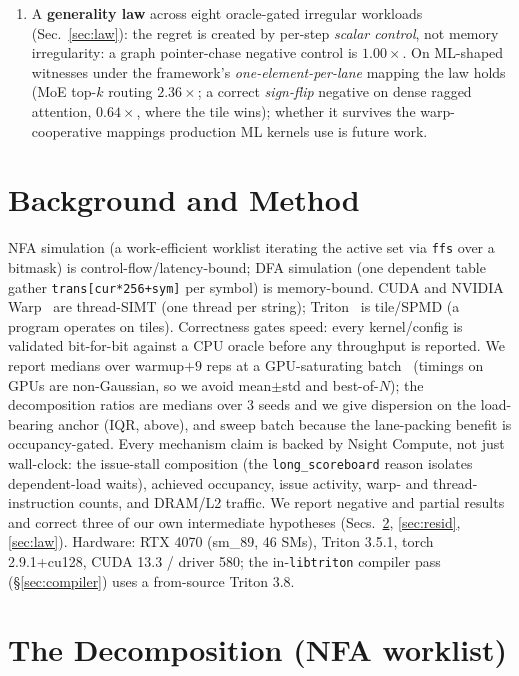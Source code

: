 \documentclass[sigplan,review,anonymous,10pt]{acmart}
\begin{document}
\begin{enumerate}
lowering is an existence proof ($4.2\times$, via \texttt{nvcc}).
\item A \textbf{generality law} across eight oracle-gated irregular workloads (Sec.~\ref{sec:law}):
the regret is created by per-step \emph{scalar control}, not memory irregularity: a graph pointer-chase
negative control is $1.00\times$. On ML-shaped witnesses under the framework's \emph{one-element-per-lane}
mapping the law holds (MoE top-$k$ routing $2.36\times$; a correct \emph{sign-flip} negative on dense
ragged attention, $0.64\times$, where the tile wins); whether it survives the warp-cooperative mappings
production ML kernels use is future work.
\end{enumerate}

\section{Background and Method}
NFA simulation (a work-efficient worklist iterating the active set via \texttt{ffs} over a bitmask) is
control-flow/latency-bound; DFA simulation (one dependent table gather \texttt{trans[cur*256+sym]} per
symbol) is memory-bound. CUDA and NVIDIA Warp~\cite{warp2022} are thread-SIMT (one thread per string);
Triton~\cite{triton2019} is tile/SPMD (a program operates on tiles). Correctness gates speed: every
kernel/config is validated bit-for-bit against a CPU oracle before any throughput is reported. We
report medians over warmup${+}9$ reps at a GPU-saturating batch~\cite{hoefler2015} (timings on GPUs
are non-Gaussian, so we avoid mean$\pm$std and best-of-$N$); the decomposition ratios are medians over 3
seeds and we give dispersion on the load-bearing anchor (IQR, above), and sweep batch because the lane-packing
benefit is occupancy-gated. Every mechanism claim is backed by Nsight Compute, not just wall-clock:
the issue-stall composition (the \texttt{long\_scoreboard} reason isolates dependent-load waits),
achieved occupancy, issue activity, warp- and thread-instruction counts, and DRAM/L2 traffic. We report negative and partial results and correct
three of our own intermediate hypotheses (Secs.~\ref{sec:decomp}, \ref{sec:resid}, \ref{sec:law}).
Hardware: RTX 4070 (sm\_89, 46 SMs), Triton 3.5.1, torch 2.9.1+cu128, CUDA 13.3 / driver 580; the
in-\texttt{libtriton} compiler pass (\S\ref{sec:compiler}) uses a from-source Triton 3.8.

\section{The Decomposition (NFA worklist)}\label{sec:decomp}
\end{document}
